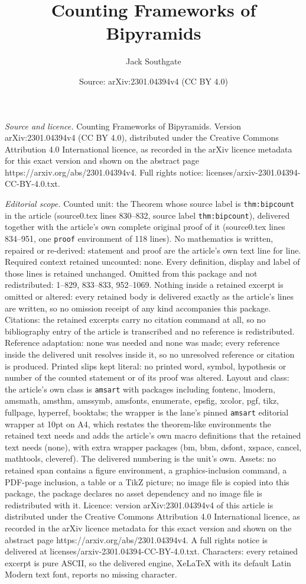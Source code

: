 \documentclass[10pt,a4paper]{amsart}
\title[Counting Frameworks of Bipyramids]{Counting Frameworks of Bipyramids}
\author{Jack Southgate}
\date{Source: arXiv:2301.04394v4 (CC BY 4.0)}
\begin{document}
\maketitle

\noindent\emph{Source and licence.} Counting Frameworks of Bipyramids. Version arXiv:2301.04394v4 (CC BY 4.0), distributed under the Creative Commons Attribution 4.0 International licence, as recorded in the arXiv licence metadata for this exact version and shown on the abstract page https://arxiv.org/abs/2301.04394v4. Full rights notice: licenses/arxiv-2301.04394-CC-BY-4.0.txt.\par\smallskip

\noindent\textit{Editorial scope.} Counted unit: the Theorem whose source label is \texttt{thm:bipcount} in the article (source0.tex lines 830--832, source label \texttt{thm:bipcount}), delivered together with the article's own complete original proof of it (source0.tex lines 834--951, one \texttt{proof} environment of 118 lines). No mathematics is written, repaired or re-derived: statement and proof are the article's own text line for line. Required context retained uncounted: none. Every definition, display and label of those lines is retained unchanged. Omitted from this package and not redistributed: 1--829, 833--833, 952--1069. Nothing inside a retained excerpt is omitted or altered: every retained body is delivered exactly as the article's lines are written, so no omission receipt of any kind accompanies this package. Citations: the retained excerpts carry no citation command at all, so no bibliography entry of the article is transcribed and no reference is redistributed. Reference adaptation: none was needed and none was made; every reference inside the delivered unit resolves inside it, so no unresolved reference or citation is produced. Printed slips kept literal: no printed word, symbol, hypothesis or number of the counted statement or of its proof was altered. Layout and class: the article's own class is \texttt{amsart} with packages including fontenc, lmodern, amsmath, amsthm, amssymb, amsfonts, enumerate, epsfig, xcolor, pgf, tikz, fullpage, hyperref, booktabs; the wrapper is the lane's pinned \texttt{amsart} editorial wrapper at 10pt on A4, which restates the theorem-like environments the retained text needs and adds the article's own macro definitions that the retained text needs (none), with extra wrapper packages (bm, bbm, dsfont, xspace, cancel, mathtools, cleveref). The delivered numbering is the unit's own. Assets: no retained span contains a figure environment, a graphics-inclusion command, a PDF-page inclusion, a table or a TikZ picture; no image file is copied into this package, the package declares no asset dependency and no image file is redistributed with it. Licence: version arXiv:2301.04394v4 of this article is distributed under the Creative Commons Attribution 4.0 International licence, as recorded in the arXiv licence metadata for this exact version and shown on the abstract page https://arxiv.org/abs/2301.04394v4. A full rights notice is delivered at licenses/arxiv-2301.04394-CC-BY-4.0.txt. Characters: every retained excerpt is pure ASCII, so the delivered engine, XeLaTeX with its default Latin Modern text font, reports no missing character.
\end{document}
